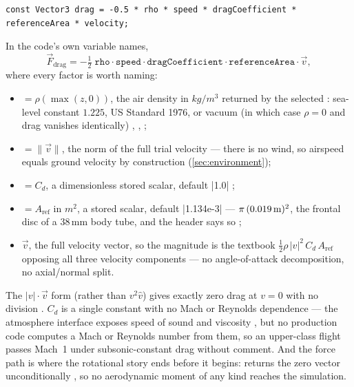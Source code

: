 \begin{verbatim}
const Vector3 drag = -0.5 * rho * speed * dragCoefficient * referenceArea * velocity;
\end{verbatim}

In the code's own variable names,
\begin{equation}
\vec{F}_{\mathrm{drag}}
  = -\tfrac{1}{2}\;\mathtt{rho}\cdot\mathtt{speed}\cdot
    \mathtt{dragCoefficient}\cdot\mathtt{referenceArea}\cdot\vec{v},
\label{eq:aero-drag}
\end{equation}
where every factor is worth naming:
\begin{itemize}
\item {} $= \rho(\max(z, 0))$, the air density in $\unit{kg/m^3}$ returned by the
  selected : sea-level constant $1.225$, US Standard 1976, or vacuum
  (in which case $\rho = 0$ and drag vanishes identically) ,
  , ;
\item {} $= \lVert\vec{v}\rVert$, the norm of the full trial velocity
   --- there is no wind, so airspeed equals ground velocity by
  construction (\cref{sec:environment});
\item {} $= C_d$, a dimensionless stored scalar, default
  \cppinline|{1.0}| ;
\item {} $= A_{\mathrm{ref}}$ in $\unit{m^2}$, a stored scalar, default
  \cppinline|{1.134e-3}| --- $\pi\,(0.019\,\mathrm{m})^2$, the frontal disc of a 38\,mm body tube, and
  the header says so ;
\item $\vec{v}$, the full velocity vector, so the magnitude is the textbook
  $\tfrac{1}{2}\rho\,|v|^2\,C_d\,A_{\mathrm{ref}}$ opposing all three velocity components
  --- no angle-of-attack decomposition, no axial/normal split.
\end{itemize}
The $|v|\cdot\vec{v}$ form (rather than $v^2\hat{v}$) gives exactly zero drag at $v = 0$
with no division . $C_d$ is a single constant with no Mach or
Reynolds dependence --- the atmosphere interface exposes speed of sound and viscosity
, but no production code computes a Mach or Reynolds number
from them, so an upper-class flight
passes Mach~1 under subsonic-constant drag without comment. And the force path is where the
rotational story ends before it begins:  returns the zero vector
unconditionally , so no aerodynamic moment of any kind
reaches the simulation.


